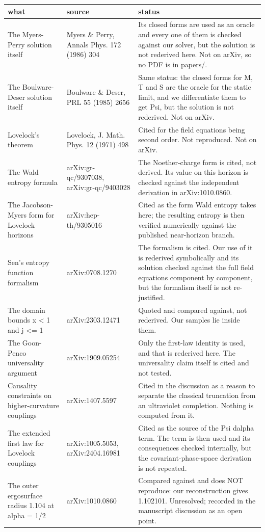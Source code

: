 \documentclass[11pt,a4paper]{article}
\begin{document}
\begin{longtable}{@{}L{.30\textwidth}L{.22\textwidth}L{.42\textwidth}@{}}
\toprule
what & source & status \\
\midrule\endhead
The Myers-Perry solution itself & Myers \& Perry, Annals Phys. 172 (1986) 304 & Its closed forms are used as an oracle and every one of them is checked against our solver, but the solution is not rederived here. Not on arXiv, so no PDF is in papers/. \\
The Boulware-Deser solution itself & Boulware \& Deser, PRL 55 (1985) 2656 & Same status: the closed forms for M, T and S are the oracle for the static limit, and we differentiate them to get Psi, but the solution is not rederived. Not on arXiv. \\
Lovelock's theorem & Lovelock, J. Math. Phys. 12 (1971) 498 & Cited for the field equations being second order. Not reproduced. Not on arXiv. \\
The Wald entropy formula & arXiv:gr-qc/9307038, arXiv:gr-qc/9403028 & The Noether-charge form is cited, not derived. Its value on this horizon is checked against the independent derivation in arXiv:1010.0860. \\
The Jacobson-Myers form for Lovelock horizons & arXiv:hep-th/9305016 & Cited as the form Wald entropy takes here; the resulting entropy is then verified numerically against the published near-horizon branch. \\
Sen's entropy function formalism & arXiv:0708.1270 & The formalism is cited. Our use of it is rederived symbolically and its solution checked against the full field equations component by component, but the formalism itself is not re-justified. \\
The domain bounds x < 1 and j <= 1 & arXiv:2303.12471 & Quoted and compared against, not rederived. Our samples lie inside them. \\
The Goon-Penco universality argument & arXiv:1909.05254 & Only the first-law identity is used, and that is rederived here. The universality claim itself is cited and not tested. \\
Causality constraints on higher-curvature couplings & arXiv:1407.5597 & Cited in the discussion as a reason to separate the classical truncation from an ultraviolet completion. Nothing is computed from it. \\
The extended first law for Lovelock couplings & arXiv:1005.5053, arXiv:2404.16981 & Cited as the source of the Psi dalpha term. The term is then used and its consequences checked internally, but the covariant-phase-space derivation is not repeated. \\
The outer ergosurface radius 1.104 at alpha = 1/2 & arXiv:1010.0860 & Compared against and does NOT reproduce: our reconstruction gives 1.102101. Unresolved; recorded in the manuscript discussion as an open point. \\
\bottomrule
\end{longtable}
\end{document}
